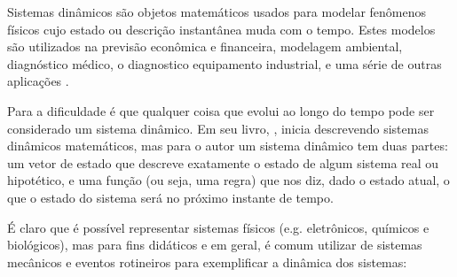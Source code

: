 Sistemas dinâmicos são objetos matemáticos usados para modelar fenômenos físicos cujo estado ou descrição instantânea muda com o tempo. Estes modelos são utilizados na previsão econômica e financeira, modelagem ambiental, diagnóstico médico, o diagnostico equipamento industrial, e uma série de outras aplicações \cite{Dean1991}.

Para \cite{Scheinerman1995} a dificuldade é que qualquer coisa que evolui ao longo do tempo pode ser considerado um sistema dinâmico. Em seu livro, \cite{Scheinerman1995}, inicia descrevendo sistemas dinâmicos matemáticos, mas para o autor um sistema dinâmico tem duas partes: um vetor de estado que descreve exatamente o estado de algum sistema real ou hipotético, e uma função (ou seja, uma regra) que nos diz, dado o estado atual, o que o estado do sistema será no próximo instante de tempo.

É claro que é possível representar sistemas físicos (e.g. eletrônicos, químicos e biológicos), mas para fins didáticos e em geral, é comum utilizar de sistemas mecânicos e eventos rotineiros para exemplificar a dinâmica dos sistemas:

